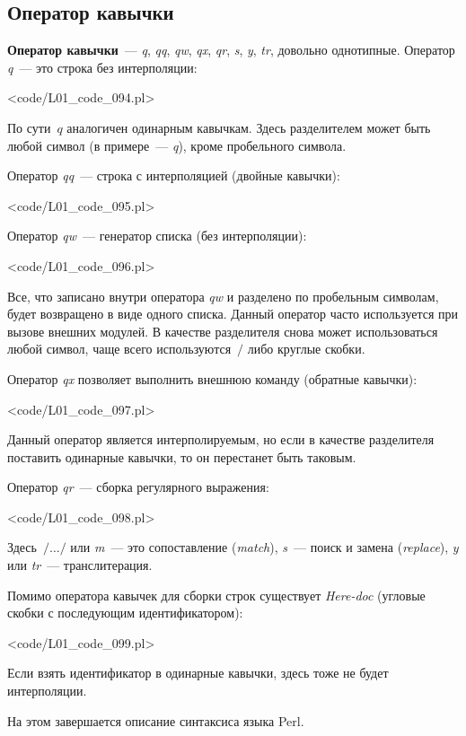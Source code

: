 \subsection{Оператор кавычки}
\textbf{Оператор кавычки}~--- \textit{q}, \textit{qq}, \textit{qw}, \textit{qx}, \textit{qr}, \textit{s}, \textit{y}, \textit{tr}, довольно однотипные.
Оператор \textit{q}~--- это строка без интерполяции:

\pr<code/L01_code_094.pl>

По сути~$q$ аналогичен одинарным кавычкам.
Здесь разделителем может быть любой символ (в примере~--- \textit{q}), кроме пробельного символа.

Оператор \textit{qq}~--- строка с интерполяцией (двойные кавычки):

\pr<code/L01_code_095.pl>

Оператор \textit{qw}~--- генератор списка (без интерполяции):

\pr<code/L01_code_096.pl>

Все, что записано внутри оператора \textit{qw} и разделено по пробельным символам, будет возвращено в виде одного списка.
Данный оператор часто используется при вызове внешних модулей.
В качестве разделителя снова может использоваться любой символ, чаще всего используются~$/$ либо круглые скобки.

Оператор \textit{qx} позволяет выполнить внешнюю команду (обратные кавычки):

\pr<code/L01_code_097.pl>

Данный оператор является интерполируемым, но если в качестве разделителя поставить одинарные кавычки, то он перестанет быть таковым.

Оператор \textit{qr}~--- сборка регулярного выражения:

\pr<code/L01_code_098.pl>

Здесь~$/\dots/$ или \textit{m}~--- это сопоставление (\textit{match}), \textit{s}~--- поиск и замена (\textit{replace}), \textit{y} или \textit{tr}~--- транслитерация.

Помимо оператора кавычек для сборки строк существует \textit{Here-doc} (угловые скобки с последующим идентификатором):

\pr<code/L01_code_099.pl>

Если взять идентификатор в одинарные кавычки, здесь тоже не будет интерполяции.

На этом завершается описание синтаксиса языка Perl.
\renewcommand{\lasttiming}{6640}

